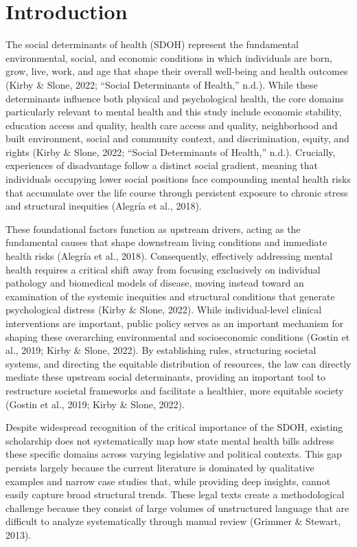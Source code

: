 \documentclass[10pt,twocolumn]{article}
\begin{document}
\section{Introduction}\label{introduction}

The social determinants of health (SDOH) represent the fundamental
environmental, social, and economic conditions in which individuals are
born, grow, live, work, and age that shape their overall well-being and
health outcomes (Kirby \& Slone, 2022; {``Social {Determinants} of
{Health},''} n.d.). While these determinants influence both physical and
psychological health, the core domains particularly relevant to mental
health and this study include economic stability, education access and
quality, health care access and quality, neighborhood and built
environment, social and community context, and discrimination, equity,
and rights (Kirby \& Slone, 2022; {``Social {Determinants} of
{Health},''} n.d.). Crucially, experiences of disadvantage follow a
distinct social gradient, meaning that individuals occupying lower
social positions face compounding mental health risks that accumulate
over the life course through persistent exposure to chronic stress and
structural inequities (Alegría et al., 2018).

These foundational factors function as upstream drivers, acting as the
fundamental causes that shape downstream living conditions and immediate
health risks (Alegría et al., 2018). Consequently, effectively
addressing mental health requires a critical shift away from focusing
exclusively on individual pathology and biomedical models of disease,
moving instead toward an examination of the systemic inequities and
structural conditions that generate psychological distress (Kirby \&
Slone, 2022). While individual-level clinical interventions are
important, public policy serves as an important mechanism for shaping
these overarching environmental and socioeconomic conditions (Gostin et
al., 2019; Kirby \& Slone, 2022). By establishing rules, structuring
societal systems, and directing the equitable distribution of resources,
the law can directly mediate these upstream social determinants,
providing an important tool to restructure societal frameworks and
facilitate a healthier, more equitable society (Gostin et al., 2019;
Kirby \& Slone, 2022).

Despite widespread recognition of the critical importance of the SDOH,
existing scholarship does not systematically map how state mental health
bills address these specific domains across varying legislative and
political contexts. This gap persists largely because the current
literature is dominated by qualitative examples and narrow case studies
that, while providing deep insights, cannot easily capture broad
structural trends. These legal texts create a methodological challenge
because they consist of large volumes of unstructured language that are
difficult to analyze systematically through manual review (Grimmer \&
Stewart, 2013).
\end{document}
